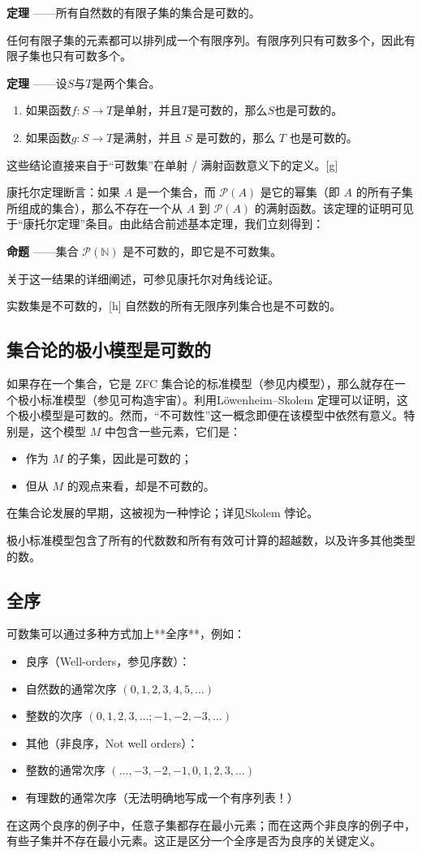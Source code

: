 {\textbf{定理} ——所有自然数的有限子集的集合是可数的。

任何有限子集的元素都可以排列成一个有限序列。有限序列只有可数多个，因此有限子集也只有可数多个。

\textbf{定理} ——设$S$与$T$是两个集合。
\begin{enumerate}
\item 如果函数$f : S \to T$是单射，并且$T$是可数的，那么$S$也是可数的。
\item 如果函数$g : S \to T$是满射，并且 $S$ 是可数的，那么 $T$ 也是可数的。
\end{enumerate}

这些结论直接来自于“可数集”在单射 / 满射函数意义下的定义。[g]

康托尔定理断言：如果 $A$ 是一个集合，而 $\mathcal{P}(A)$ 是它的幂集（即 $A$ 的所有子集所组成的集合），那么不存在一个从 $A$ 到 $\mathcal{P}(A)$ 的满射函数。该定理的证明可见于“康托尔定理”条目。由此结合前述基本定理，我们立刻得到：

\textbf{命题} ——集合 $\mathcal{P}(\mathbb{N})$ 是不可数的，即它是不可数集。

关于这一结果的详细阐述，可参见康托尔对角线论证。

实数集是不可数的，[h] 自然数的所有无限序列集合也是不可数的。
\subsection{集合论的极小模型是可数的}
如果存在一个集合，它是 ZFC 集合论的标准模型（参见内模型），那么就存在一个极小标准模型（参见可构造宇宙）。利用Löwenheim–Skolem 定理可以证明，这个极小模型是可数的。然而，“不可数性”这一概念即便在该模型中依然有意义。特别是，这个模型 $M$ 中包含一些元素，它们是：
\begin{itemize}
\item 作为 $M$ 的子集，因此是可数的；
\item 但从 $M$ 的观点来看，却是不可数的。
\end{itemize}
在集合论发展的早期，这被视为一种悖论；详见Skolem 悖论。

极小标准模型包含了所有的代数数和所有有效可计算的超越数，以及许多其他类型的数。
\subsection{全序}

可数集可以通过多种方式加上**全序**，例如：

\begin{itemize}
\item 良序（Well-orders，参见序数）：
\item 自然数的通常次序 $(0, 1, 2, 3, 4, 5, \dots)$
\item 整数的次序 $(0, 1, 2, 3, \dots; -1, -2, -3, \dots)$
\item 其他（非良序，Not well orders）：
\item 整数的通常次序 $(\dots, -3, -2, -1, 0, 1, 2, 3, \dots)$
\item 有理数的通常次序（无法明确地写成一个有序列表！）
\end{itemize}
在这两个良序的例子中，任意子集都存在最小元素；而在这两个非良序的例子中，有些子集并不存在最小元素。这正是区分一个全序是否为良序的关键定义。
}
